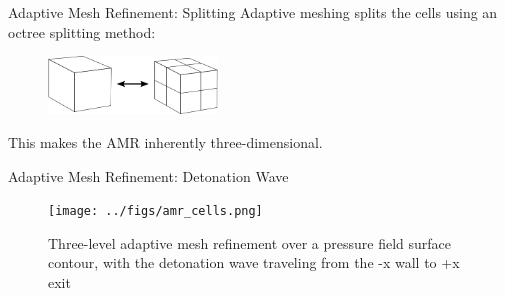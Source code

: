 \begin{frame}{Adaptive Mesh Refinement: Splitting}
Adaptive meshing splits the cells using an octree splitting method:
\begin{figure}[]
\centering
\includegraphics[width=0.4\textwidth]{../figs/amr_example.png}
\end{figure}%
This makes the AMR inherently three-dimensional. 
\end{frame}

\begin{frame}{Adaptive Mesh Refinement: Detonation Wave}
\begin{figure}
\centering
\texttt{[image: ../figs/amr\_cells.png]}
\caption{Three-level adaptive mesh refinement over a pressure field surface contour, with the detonation wave traveling from the -x wall to +x exit}
\end{figure}
\end{frame}

